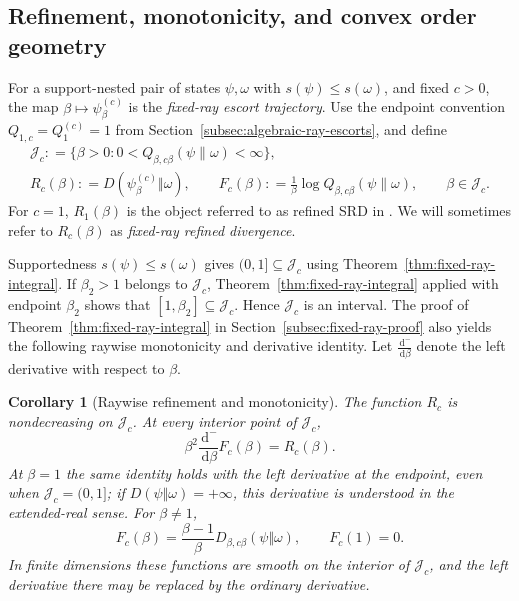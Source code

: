 \documentclass[12pt]{article}
\numberwithin{equation}{section}
\newtheorem{corollary}[theorem]{Corollary}
\theoremstyle{definition}
\theoremstyle{remark}
\newcommand{\dd}{\,\mathrm d}
\newcommand{\?}{\overset{?}{=}}
\newcommand{\defeq}{\mathrel{\mathop:}=}
\begin{document}
\subsection{Refinement, monotonicity, and convex order geometry}

For a support-nested pair of states $\psi,\omega$ with $s(\psi)\leq s(\omega)$, and fixed $c>0$, the map
$\beta\mapsto\psi_\beta^{(c)}$ is the \emph{fixed-ray escort trajectory}.
Use the endpoint convention $Q_{1,c}=Q_1^{(c)}=1$ from
Section~\ref{subsec:algebraic-ray-escorts}, and define
\begin{equation}
  \begin{gathered}
  \mathcal J_c
  \defeq\{\beta>0:0<Q_{\beta,c\beta}(\psi\|\omega)<\infty\},\\
  R_c(\beta)\defeq D(\psi_\beta^{(c)}\Vert\omega),
  \qquad
  F_c(\beta)\defeq\frac1\beta
       \log Q_{\beta,c\beta}(\psi\|\omega),
  \qquad \beta\in\mathcal J_c.
  \end{gathered}
  \label{eq:escort-profile}
\end{equation}
For $c=1$, $R_1(\beta)$ is the object referred to as refined SRD in \cite{Bao:2019aol}. We will sometimes refer to $R_c(\beta)$ as \textit{fixed-ray refined divergence}. 

Supportedness $s(\psi)\leq s(\omega)$ gives $(0,1]\subseteq\mathcal J_c$ using Theorem~\ref{thm:fixed-ray-integral}.  If
$\beta_2>1$ belongs to $\mathcal J_c$, Theorem~\ref{thm:fixed-ray-integral}
applied with endpoint $\beta_2$ shows that
$[1,\beta_2]\subseteq\mathcal J_c$.  Hence $\mathcal J_c$ is an interval.
The proof of Theorem~\ref{thm:fixed-ray-integral} in
Section~\ref{subsec:fixed-ray-proof} also yields the following raywise
monotonicity and derivative identity. Let $\frac{\dd^-}{\dd\beta}$ denote the left derivative with respect to $\beta$. 

\begin{corollary}[Raywise refinement and monotonicity]
\label{cor:raywise-monotonicity}
The function $R_c$ is nondecreasing on $\mathcal J_c$.  At every interior
point of $\mathcal J_c$,
\begin{equation}
  \beta^2\frac{\dd^-}{\dd\beta}F_c(\beta)
  =R_c(\beta).
  \label{eq:raywise-refined-identity}
\end{equation}
At $\beta=1$ the same identity holds with the left derivative at the
endpoint, even when $\mathcal J_c=(0,1]$; if
$D(\psi\Vert\omega)=+\infty$, this derivative is understood in the
extended-real sense.  For $\beta\neq1$,
\[
  F_c(\beta)=\frac{\beta-1}{\beta}
  D_{\beta,c\beta}(\psi\Vert\omega),
  \qquad F_c(1)=0.
\]
In finite dimensions these functions are smooth on the interior of
$\mathcal J_c$, and the left derivative there may be replaced by the
ordinary derivative.
\end{corollary}
\end{document}
